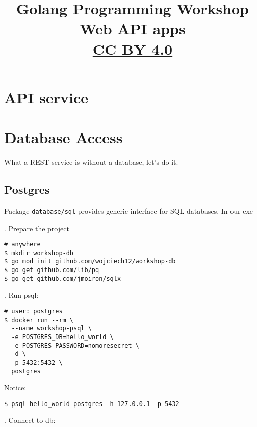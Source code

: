 \documentclass[11pt, letterpaper]{article}
\title{Golang Programming Workshop\\Web API apps\\{ \small \href{https://creativecommons.org/licenses/by/4.0/}{CC BY 4.0} }  }
\date{}
\begin{document}

\begin{titlepage}
\maketitle
\end{titlepage}

\tableofcontents
\pagebreak

\section{API service}


\section{Database Access}
What a {\small REST} service is without a database, let's do it.

\subsection{Postgres}

Package \verb|database/sql| provides generic interface for {\small SQL} databases. In our exe

. Prepare the project

\begin{verbatim}
# anywhere 
$ mkdir workshop-db
$ go mod init github.com/wojciech12/workshop-db
$ go get github.com/lib/pq
$ go get github.com/jmoiron/sqlx
\end{verbatim}

. Run psql:

\begin{verbatim}
# user: postgres
$ docker run --rm \
  --name workshop-psql \
  -e POSTGRES_DB=hello_world \
  -e POSTGRES_PASSWORD=nomoresecret \
  -d \
  -p 5432:5432 \
  postgres
\end{verbatim}

Notice:

\begin{verbatim}
$ psql hello_world postgres -h 127.0.0.1 -p 5432
\end{verbatim}

\bigskip
3. Connect to db:
\end{document}
